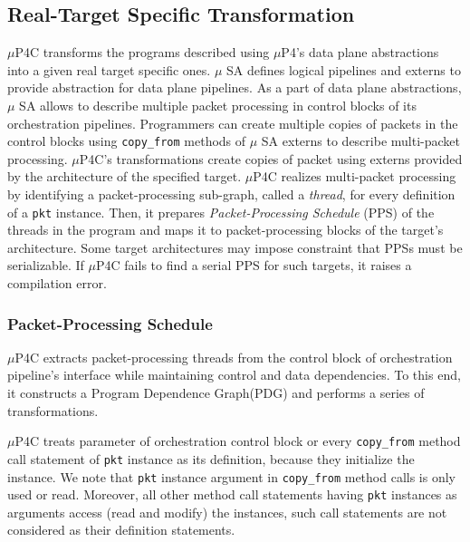 \subsection{Real-Target Specific Transformation}
$\mu$P4C transforms the programs described using $\mu$P4's data plane abstractions into a given real target specific ones.
$\mu$ SA defines logical pipelines and externs to provide abstraction for data plane pipelines.
As a part of data plane abstractions, $\mu$ SA allows to describe multiple packet processing in control blocks of its orchestration pipelines.
Programmers can create multiple copies of packets in the control blocks using \texttt{copy\_from} methods of $\mu$ SA externs to describe multi-packet processing.
$\mu$P4C's transformations create copies of packet using externs provided by the architecture of the specified target.
$\mu$P4C realizes multi-packet processing by identifying a packet-processing sub-graph, called a \emph{thread}, for every definition of a \texttt{pkt} instance.
Then, it prepares \emph{Packet-Processing Schedule} (PPS) of the threads in the program and maps it to packet-processing blocks of the target's architecture.
Some target architectures may impose constraint that PPSs must be serializable.
If $\mu$P4C fails to find a serial PPS for such targets, it raises a compilation error. 


\subsubsection{Packet-Processing Schedule}
$\mu$P4C extracts packet-processing threads from the control block of orchestration pipeline's interface while maintaining control and data dependencies.
To this end, it constructs a Program Dependence Graph(PDG) \cite{Ferrante:1987:PDG:24039.24041} and performs a series of transformations.

$\mu$P4C treats parameter of orchestration control block or every \texttt{copy\_from} method call statement of \texttt{pkt} instance as its definition, because they initialize the instance.
We note that \texttt{pkt} instance argument in \texttt{copy\_from} method calls is only used or read.
Moreover, all other method call statements having \texttt{pkt} instances as arguments access (read and modify) the instances, such call statements are not considered as their definition statements.


